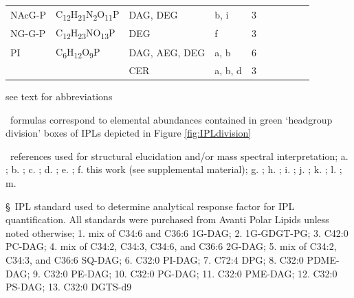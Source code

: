 {\begin{landscape}
\begin{table}
\begin{adjustbox}{width=\textheight,keepaspectratio}
\begin{threeparttable}
\begin{tabular}{lrllcrrrrr}
NAcG-P & \multicolumn{1}{l}{C\textsubscript{12}H\textsubscript{21}N\textsubscript{2}O\textsubscript{11}P} & DAG, DEG & b, i  & 3     &       &       &       &       &  \\
NG-G-P & \multicolumn{1}{l}{C\textsubscript{12}H\textsubscript{23}NO\textsubscript{13}P} & DEG   & f     & 3     &       &       &       &       &  \\
PI    & \multicolumn{1}{l}{C\textsubscript{6}H\textsubscript{12}O\textsubscript{9}P} & DAG, AEG, DEG & a, b  & 6     &       &       &       &       &  \\
      &       & CER   & a, b, d & 3     &       &       &       &       &  \\
\bottomrule
\end{tabular}%


\begin{tablenotes}
\small
\item * see text for abbreviations
\item \dag~formulas correspond to elemental abundances contained in green `headgroup division' boxes of IPLs depicted in Figure \ref{fig:IPLdivision}
\item \ddag~references used for structural elucidation and/or mass spectral interpretation; a. \cite{Sturt_Intact_2004}; b. \cite{schubotz2013spatial}
; c. \cite{Yoshinaga_Systematic_2011}; d. \cite{karlsson1998molecular}; e. \cite{ferreira1999characterization}; f. this work (see supplemental material); g. \cite{diercks2015accumulation}; h. \cite{schubotz2015stable}; i. \cite{yang2006structural}; j. \cite{wang2015improved}; k. \cite{benning1995accumulation}; l. \cite{zhang2009characterization}; m. \cite{moore2013novel}
\item \S~IPL standard used to determine analytical response factor for IPL quantification. All standards were purchased from Avanti Polar Lipids unless noted otherwise; 1. mix of C34:6 and C36:6 1G-DAG; 2. 1G-GDGT-PG; 3. C42:0 PC-DAG; 4. mix of C34:2, C34:3, C34:6, and C36:6 2G-DAG; 5. mix of C34:2, C34:3, and C36:6 SQ-DAG; 6. C32:0 PI-DAG; 7. C72:4 DPG; 8. C32:0 PDME-DAG; 9. C32:0 PE-DAG; 10. C32:0 PG-DAG; 11. C32:0 PME-DAG; 12. C32:0 PS-DAG; 13. C32:0 DGTS-d9
\normalsize
\end{tablenotes}

  \label{tab:IPL}
  \end{threeparttable}
  \end{adjustbox}
\end{table}

\end{landscape}
\doublespace
}

